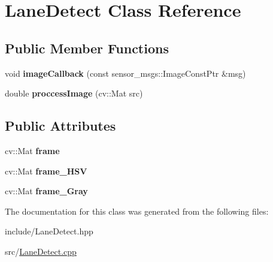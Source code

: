 \hypertarget{class_lane_detect}{}\section{Lane\+Detect Class Reference}
\label{class_lane_detect}
\subsection*{Public Member Functions}
\begin{DoxyCompactItemize}
\item 
\mbox{\label{class_lane_detect_ad445e778e831d284445cdeb029294307}} 
void {\bfseries image\+Callback} (const sensor\+\_\+msgs\+::\+Image\+Const\+Ptr \&msg)
\item 
\mbox{\label{class_lane_detect_afe72eddc8fe2552be3ebe5c3870c5d4d}} 
double {\bfseries proccess\+Image} (cv\+::\+Mat src)
\end{DoxyCompactItemize}
\subsection*{Public Attributes}
\begin{DoxyCompactItemize}
\item 
\mbox{\label{class_lane_detect_aae2523dbe6922b5695155ab99959d998}} 
cv\+::\+Mat {\bfseries frame}
\item 
\mbox{\label{class_lane_detect_a3e4d94124272c05656fe040353589f48}} 
cv\+::\+Mat {\bfseries frame\+\_\+\+H\+SV}
\item 
\mbox{\label{class_lane_detect_acde6292d7654064af82aa7e62f9578b5}} 
cv\+::\+Mat {\bfseries frame\+\_\+\+Gray}
\end{DoxyCompactItemize}


The documentation for this class was generated from the following files\+:\begin{DoxyCompactItemize}
\item 
include/Lane\+Detect.\+hpp\item 
src/\mbox{\hyperlink{_lane_detect_8cpp}{Lane\+Detect.\+cpp}}\end{DoxyCompactItemize}
